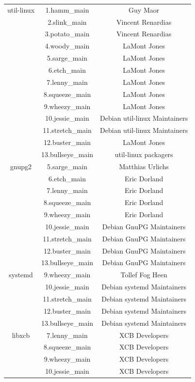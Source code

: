 \documentclass[a4paper, 12pt]{book}
\begin{document}
\begin{longtable}{|c|c|c|}
		util-linux
		& 1.hamm\_main & Guy Maor \\
		& 2.slink\_main & Vincent Renardias \\
		& 3.potato\_main & Vincent Renardias \\
		& 4.woody\_main & LaMont Jones \\
		& 5.sarge\_main & LaMont Jones \\
		& 6.etch\_main & LaMont Jones \\
		& 7.lenny\_main & LaMont Jones \\
		& 8.squeeze\_main & LaMont Jones \\
		& 9.wheezy\_main & LaMont Jones \\
		& 10.jessie\_main & Debian util-linux Maintainers \\
		& 11.stretch\_main & Debian util-linux Maintainers \\
		& 12.buster\_main & LaMont Jones \\
		& 13.bullseye\_main & util-linux packagers \\
		\hline
		gnupg2 & 5.sarge\_main & Matthias Urlichs \\
		& 6.etch\_main & Eric Dorland \\
		& 7.lenny\_main & Eric Dorland \\
		& 8.squeeze\_main & Eric Dorland \\
		& 9.wheezy\_main & Eric Dorland \\
		& 10.jessie\_main & Debian GnuPG Maintainers \\
		& 11.stretch\_main & Debian GnuPG Maintainers \\
		& 12.buster\_main & Debian GnuPG Maintainers \\
		& 13.bullseye\_main & Debian GnuPG Maintainers \\
		\hline
		systemd & 9.wheezy\_main & Tollef Fog Heen \\
		& 10.jessie\_main & Debian systemd Maintainers \\
		& 11.stretch\_main & Debian systemd Maintainers \\
		& 12.buster\_main & Debian systemd Maintainers \\
		& 13.bullseye\_main & Debian systemd Maintainers \\
		\hline
		libxcb & 7.lenny\_main & XCB Developers \\
		& 8.squeeze\_main & XCB Developers \\
		& 9.wheezy\_main & XCB Developers \\
		& 10.jessie\_main & XCB Developers \\

\end{longtable}
\end{document}

